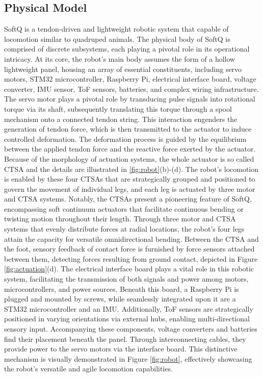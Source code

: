 \subsection{Physical Model}
SoftQ is a tendon-driven and lightweight robotic system that capable of locomotion similar to quadruped animals. The physical body of SoftQ is comprised of discrete subsystems, each playing a pivotal role in its operational intricacy. At its core, the robot's main body assumes the form of a hollow lightweight panel, housing an array of essential constituents, including servo motors, STM32 microcontroller, Raspberry Pi, electrical interface board, voltage converter, \ac{IMU} sensor, \ac{ToF} sensors, batteries, and complex wiring infrastructure. The servo motor plays a pivotal role by transducing pulse signals into rotational torque via its shaft, subsequently translating this torque through a spool mechanism onto a connected tendon string. This interaction engenders the generation of tendon force, which is then transmitted to the actuator to induce controlled deformation. The deformation process is guided by the equilibrium between the applied tendon force and the reactive force exerted by the actuator. Because of the morphology of actuation systems, the whole actuator is so called \ac{CTSA} and the details are illustrated in \ref{fig:robot}(b)-(d). The robot's locomotion is enabled by these four \ac{CTSA}s that are strategically grouped and positioned to govern the movement of individual legs, and each leg is actuated by three motor and \ac{CTSA} systems.  Notably, the \ac{CTSA}s present a pioneering feature of SoftQ, encompassing soft continuum actuators that facilitate continuous bending or twisting motion throughout their length. Through three motor and \ac{CTSA} systems that evenly distribute forces at radial locations, the robot's four legs attain the capacity for versatile omnidirectional bending\cite{ji2022Omnidirectional}. Between the \ac{CTSA} and the foot, sensory feedback of contact force is furnished by force sensors attached between them, detecting forces resulting from ground contact, depicted in Figure \ref{fig:actuation}(d). The electrical interface board plays a vital role in this robotic system, facilitating the transmission of both signals and power among motors, microcontrollers, and power sources. Beneath this board, a Raspberry Pi is plugged and mounted by screws, while seamlessly integrated upon it are a STM32 microcontroller and an \ac{IMU}. Additionally, \ac{ToF} sensors are strategically positioned in varying orientations via external hubs, enabling multi-directional sensory input. Accompanying these components, voltage converters and batteries find their placement beneath the panel. Through interconnecting cables, they provide power to the servo motors via the interface board. This distinctive mechanism is visually demonstrated in Figure \ref{fig:robot}, effectively showcasing the robot's versatile and agile locomotion capabilities.

